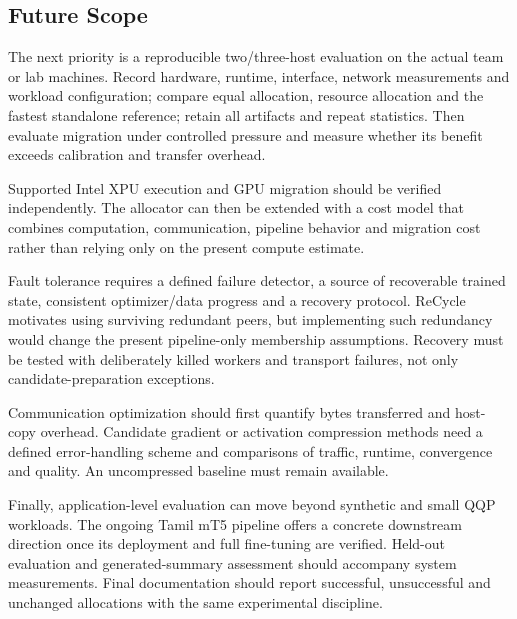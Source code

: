 \subsection{Future Scope}

The next priority is a reproducible two/three-host evaluation on the actual team or lab machines. Record hardware, runtime, interface, network measurements and workload configuration; compare equal allocation, resource allocation and the fastest standalone reference; retain all artifacts and repeat statistics. Then evaluate migration under controlled pressure and measure whether its benefit exceeds calibration and transfer overhead.

Supported Intel XPU execution and GPU migration should be verified independently. The allocator can then be extended with a cost model that combines computation, communication, pipeline behavior and migration cost rather than relying only on the present compute estimate.

Fault tolerance requires a defined failure detector, a source of recoverable trained state, consistent optimizer/data progress and a recovery protocol. ReCycle motivates using surviving redundant peers, but implementing such redundancy would change the present pipeline-only membership assumptions. Recovery must be tested with deliberately killed workers and transport failures, not only candidate-preparation exceptions.

Communication optimization should first quantify bytes transferred and host-copy overhead. Candidate gradient or activation compression methods need a defined error-handling scheme and comparisons of traffic, runtime, convergence and quality. An uncompressed baseline must remain available.

Finally, application-level evaluation can move beyond synthetic and small QQP workloads. The ongoing Tamil mT5 pipeline offers a concrete downstream direction once its deployment and full fine-tuning are verified. Held-out evaluation and generated-summary assessment should accompany system measurements. Final documentation should report successful, unsuccessful and unchanged allocations with the same experimental discipline.

